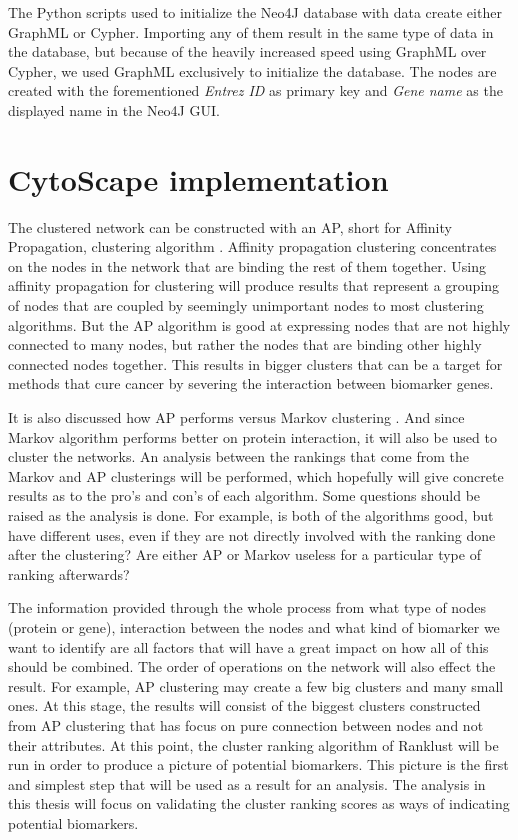 The Python scripts used to initialize the Neo4J database with data create either
GraphML or Cypher. Importing any of them result in the same type of data in the
database, but because of the heavily increased speed using GraphML over Cypher,
we used GraphML exclusively to initialize the database. The nodes are created
with the forementioned \textit{Entrez ID} as primary key and \textit{Gene name}
as the displayed name in the Neo4J GUI.

\chapter{CytoScape implementation}
The clustered network can be constructed with an AP, short for Affinity
Propagation, clustering algorithm \cite{affinity-propagation}. Affinity
propagation clustering concentrates on the nodes in the network that are binding
the rest of them together. Using affinity propagation for clustering will
produce results that represent a grouping of nodes that are coupled by seemingly
unimportant nodes to most clustering algorithms. But the AP algorithm is good at
expressing nodes that are not highly connected to many nodes, but rather the
nodes that are binding other highly connected nodes together. This results in
bigger clusters that can be a target for methods that cure cancer by severing
the interaction between biomarker genes.

It is also discussed how AP performs versus Markov clustering \cite{ap-vs-mcl}.
And since Markov algorithm performs better on protein interaction, it will also
be used to cluster the networks. An analysis between the rankings that come from
the Markov and AP clusterings will be performed, which hopefully will give
concrete results as to the pro's and con's of each algorithm. Some questions
should be raised as the analysis is done. For example, is both of the algorithms
good, but have different uses, even if they are not directly involved with the
ranking done after the clustering?  Are either AP or Markov useless for
a particular type of ranking afterwards?

The information provided through the whole process from what type of nodes
(protein or gene), interaction between the nodes and what kind of biomarker we
want to identify are all factors that will have a great impact on how all of
this should be combined. The order of operations on the network will also effect
the result. For example, AP clustering may create a few big clusters and many
small ones. At this stage, the results will consist of the biggest clusters
constructed from AP clustering that has focus on pure connection between nodes
and not their attributes. At this point, the cluster ranking algorithm of
Ranklust will be run in order to produce a picture of potential biomarkers. This
picture is the first and simplest step that will be used as a result for an
analysis. The analysis in this thesis will focus on validating the cluster
ranking scores as ways of indicating potential biomarkers. 
